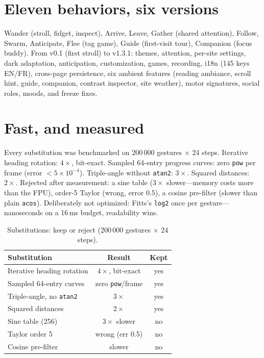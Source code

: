 \documentclass[10pt,conference]{IEEEtran}
\begin{document}
\section{Eleven behaviors, six versions}
Wander (stroll, fidget, inspect), Arrive, Leave, Gather (shared attention),
Follow, Swarm, Anticipate, Flee (tag game), Guide (first-visit tour),
Companion (focus buddy). From v0.1 (first stroll) to v1.3.1: themes,
attention, per-site settings, dark adaptation, anticipation, customization,
games, recording, i18n (145 keys EN/FR), cross-page persistence, six ambient
features (reading ambiance, scroll hint, guide, companion, contrast
inspector, site weather), motor signatures, social roles, moods, and freeze
fixes.

\section{Fast, and measured}
Every substitution was benchmarked on 200\,000 gestures $\times$ 24 steps.
Iterative heading rotation: $4\times$, bit-exact. Sampled 64-entry progress
curves: zero \texttt{pow} per frame (error $<5\times10^{-4}$). Triple-angle
without \texttt{atan2}: $3\times$. Squared distances: $2\times$. Rejected
after measurement: a sine table ($3\times$ slower---memory costs more than
the FPU), order-5 Taylor (wrong, error 0.5), a cosine pre-filter (slower than
plain \texttt{acos}). Deliberately not optimized: Fitts's \texttt{log2} once
per gesture---nanoseconds on a 16\,ms budget, readability wins.

\begin{table}[h]
\centering
\caption{Substitutions: keep or reject (200\,000 gestures $\times$ 24 steps).}
\begin{tabular}{@{}lcc@{}}
\toprule
Substitution & Result & Kept \\
\midrule
Iterative heading rotation & $4\times$, bit-exact & yes \\
Sampled 64-entry curves & zero \texttt{pow}/frame & yes \\
Triple-angle, no \texttt{atan2} & $3\times$ & yes \\
Squared distances & $2\times$ & yes \\
Sine table (256) & $3\times$ slower & no \\
Taylor order 5 & wrong (err 0.5) & no \\
Cosine pre-filter & slower & no \\
\bottomrule
\end{tabular}
\end{table}
\end{document}
